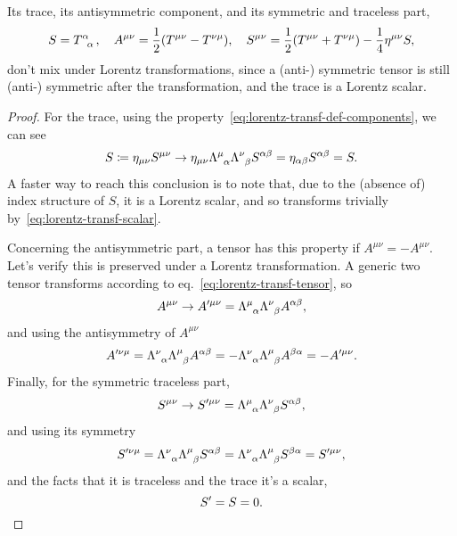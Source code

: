 Its trace, its antisymmetric component, and its symmetric and traceless part,
\begin{equation}
   S = \tensor{T}{^\alpha_\alpha} , \quad A^{\mu\nu} = \frac{1}{2} (T^{\mu\nu} - T^{\nu\mu}), \quad S^{\mu\nu} = \frac{1}{2} (T^{\mu\nu} + T^{\nu\mu}) - \frac{1}{4} \eta^{\mu\nu} S, 
\end{equation}
don't mix under Lorentz transformations, since a (anti-) symmetric tensor is still (anti-) symmetric after the transformation, and the trace is a Lorentz scalar.
\begin{proof}
    For the trace, using the property~\eqref{eq:lorentz-transf-def-components}, we can see
    \begin{equation*}
       S \coloneq \eta_{\mu\nu} S^{\mu\nu} \to \eta_{\mu\nu} \tensor{\Lambda}{^\mu_\alpha} \tensor{\Lambda}{^\nu_\beta} S^{\alpha\beta} = \eta_{\alpha\beta} S^{\alpha\beta} = S .
    \end{equation*}
    A faster way to reach this conclusion is to note that, due to the (absence of) index structure of $S$, it is a Lorentz scalar, and so transforms trivially by~\eqref{eq:lorentz-transf-scalar}.

    Concerning the antisymmetric part, a tensor has this property if $A^{\mu\nu} = - A^{\mu\nu}$. Let's verify this is preserved under a Lorentz transformation. A generic two tensor transforms according to eq.~\eqref{eq:lorentz-transf-tensor}, so
    \begin{equation*}
       A^{\mu\nu} \to A'^{\mu\nu} = \tensor{\Lambda}{^\mu_\alpha} \tensor{\Lambda}{^\nu_\beta} A^{\alpha\beta} ,
    \end{equation*}
    and using the antisymmetry of $A^{\mu\nu}$
    \begin{equation*}
        A'^{\nu\mu} = \tensor{\Lambda}{^\nu_\alpha} \tensor{\Lambda}{^\mu_\beta} A^{\alpha\beta} = - \tensor{\Lambda}{^\nu_\alpha} \tensor{\Lambda}{^\mu_\beta} A^{\beta\alpha} = -A'^{\mu\nu} .
    \end{equation*}
    Finally, for the symmetric traceless part,
    \begin{equation*}
        S^{\mu\nu} \to S'^{\mu\nu} = \tensor{\Lambda}{^\mu_\alpha} \tensor{\Lambda}{^\nu_\beta} S^{\alpha\beta} ,
    \end{equation*}
    and using its symmetry
    \begin{equation*}
        S'^{\nu\mu} = \tensor{\Lambda}{^\nu_\alpha} \tensor{\Lambda}{^\mu_\beta} S^{\alpha\beta} = \tensor{\Lambda}{^\nu_\alpha} \tensor{\Lambda}{^\mu_\beta} S^{\beta\alpha} = S'^{\mu\nu} ,
    \end{equation*}
    and the facts that it is traceless and the trace it's a scalar,
    \begin{equation*}
        S' = S = 0. \qedhere
    \end{equation*}
\end{proof}

